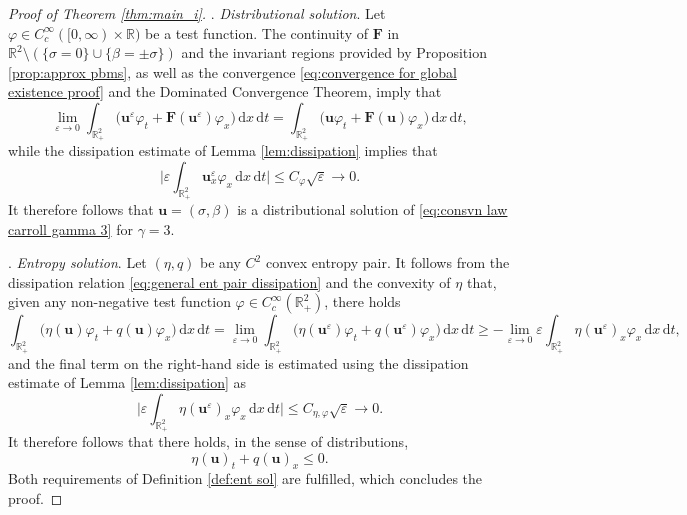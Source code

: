 \documentclass[11pt,a4paper,reqno]{amsart}
\numberwithin{equation}{section}
\theoremstyle{definition}
\theoremstyle{remark}
\newcommand{\bu}{\mathbf{u}}
\newcommand{\bF}{\mathbf{F}}
\renewcommand{\d}{\, \mathrm{d}}
\renewcommand{\leq}{\leqslant}
\renewcommand{\geq}{\geqslant}
\begin{document}
{\begin{proof}[Proof of Theorem \ref{thm:main_i}]
\smallskip 
{}. \textit{Distributional solution}. Let $\varphi \in C^\infty_c([0,\infty)\times\mathbb{R})$ be a test function. The continuity of $\bF$ in $\mathbb{R}^2 \setminus (\{\sigma=0\}\cup \{\beta = \pm \sigma\})$ and the invariant regions provided by Proposition \ref{prop:approx pbms}, as well as the convergence \eqref{eq:convergence for global existence proof} and the Dominated Convergence Theorem, imply that 
\begin{equation*}
   \lim_{\varepsilon \to 0} \int_{\mathbb{R}^2_+} \big( \bu^\varepsilon \varphi_t + \bF(\bu^\varepsilon) \varphi_x \big) \d x \d t = \int_{\mathbb{R}^2_+} \big( \bu \varphi_t + \bF(\bu) \varphi_x \big) \d x \d t, 
\end{equation*}
while the dissipation estimate of Lemma \ref{lem:dissipation} implies that
\begin{equation*}
    \bigg| \varepsilon \int_{\mathbb{R}^2_+} \bu^\varepsilon_x \varphi_x \d x \d t \bigg| \leq C_{\varphi} \sqrt{\varepsilon} \to 0. 
\end{equation*}
It therefore follows that $\bu=(\sigma,\beta)$ is a distributional solution of \eqref{eq:consvn law carroll gamma 3} for $\gamma=3$. 



\smallskip 
{}. \textit{Entropy solution}. Let $(\eta,q)$ be any $C^2$ convex entropy pair. It follows from the dissipation relation \eqref{eq:general ent pair dissipation} and the convexity of $\eta$ that, given any non-negative test function $\varphi \in C^\infty_c(\mathbb{R}^2_+)$, there holds 
\begin{equation*}
    \int_{\mathbb{R}^2_+} \big( \eta(\bu) \varphi_t + q(\bu) \varphi_x \big) \d x \d t = \lim_{\varepsilon \to 0} \int_{\mathbb{R}^2_+} \big( \eta(\bu^\varepsilon) \varphi_t + q(\bu^\varepsilon) \varphi_x \big) \d x \d t \geq -\lim_{\varepsilon\to 0}\varepsilon \int_{\mathbb{R}^2_+} \eta(\bu^\varepsilon)_x \varphi_x \d x \d t, 
\end{equation*}
and the final term on the right-hand side is estimated using the dissipation estimate of Lemma \ref{lem:dissipation} as 
\begin{equation*}
    \bigg|\varepsilon \int_{\mathbb{R}^2_+} \eta(\bu^\varepsilon)_x \varphi_x \d x \d t \bigg| \leq C_{\eta,\varphi}\sqrt{\varepsilon} \to 0. 
\end{equation*}
It therefore follows that there holds, in the sense of distributions, 
\begin{equation*}
    \eta(\bu)_t + q(\bu)_x \leq 0. 
\end{equation*}
Both requirements of Definition \ref{def:ent sol} are fulfilled, which concludes the proof. 
\end{proof}



}
\end{document}
